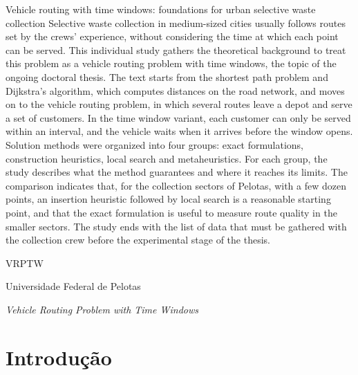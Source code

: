 \documentclass[tid]{texufpel}
\begin{document}
\begin{englishabstract}{Vehicle routing with time windows: foundations for urban selective waste collection}
Selective waste collection in medium-sized cities usually follows routes set
by the crews' experience, without considering the time at which each point
can be served. This individual study gathers the theoretical background to
treat this problem as a vehicle routing problem with time windows, the topic
of the ongoing doctoral thesis. The text starts from the shortest path
problem and Dijkstra's algorithm, which computes distances on the road
network, and moves on to the vehicle routing problem, in which several routes
leave a depot and serve a set of customers. In the time window variant, each
customer can only be served within an interval, and the vehicle waits when it
arrives before the window opens. Solution methods were organized into four
groups: exact formulations, construction heuristics, local search and
metaheuristics. For each group, the study describes what the method
guarantees and where it reaches its limits. The comparison indicates that,
for the collection sectors of Pelotas, with a few dozen points, an insertion
heuristic followed by local search is a reasonable starting point, and that
the exact formulation is useful to measure route quality in the smaller
sectors. The study ends with the list of data that must be gathered with the
collection crew before the experimental stage of the thesis.
\end{englishabstract}

\listoffigures
\listofquadros   %

\begin{listofabbrv}{VRPTW}
  \item[UFPel] Universidade Federal de Pelotas
  \item[VRPTW] \textit{Vehicle Routing Problem with Time Windows}
\end{listofabbrv}

\tableofcontents

\chapter{Introdução}
\label{cap:introducao}
\end{document}
